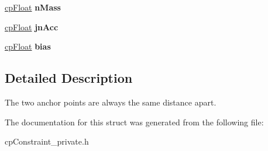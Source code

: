 \begin{DoxyCompactItemize}
\item 
\hypertarget{structcp_pin_joint_a6e13d4ba204e4421d1264737913d68c4}{}\hyperlink{group__basic_types_gac1ed65573e035bf892505768c852d8d3}{cp\+Float} {\bfseries n\+Mass}\label{structcp_pin_joint_a6e13d4ba204e4421d1264737913d68c4}

\item 
\hypertarget{structcp_pin_joint_abbb714ec340b9fc5e7d9fbd9530b8f46}{}\hyperlink{group__basic_types_gac1ed65573e035bf892505768c852d8d3}{cp\+Float} {\bfseries jn\+Acc}\label{structcp_pin_joint_abbb714ec340b9fc5e7d9fbd9530b8f46}

\item 
\hypertarget{structcp_pin_joint_a3344a217c5313f65db0b4fb773d7ea11}{}\hyperlink{group__basic_types_gac1ed65573e035bf892505768c852d8d3}{cp\+Float} {\bfseries bias}\label{structcp_pin_joint_a3344a217c5313f65db0b4fb773d7ea11}

\end{DoxyCompactItemize}


\subsection{Detailed Description}
The two anchor points are always the same distance apart. 

The documentation for this struct was generated from the following file\+:\begin{DoxyCompactItemize}
\item 
cp\+Constraint\+\_\+private.\+h\end{DoxyCompactItemize}
